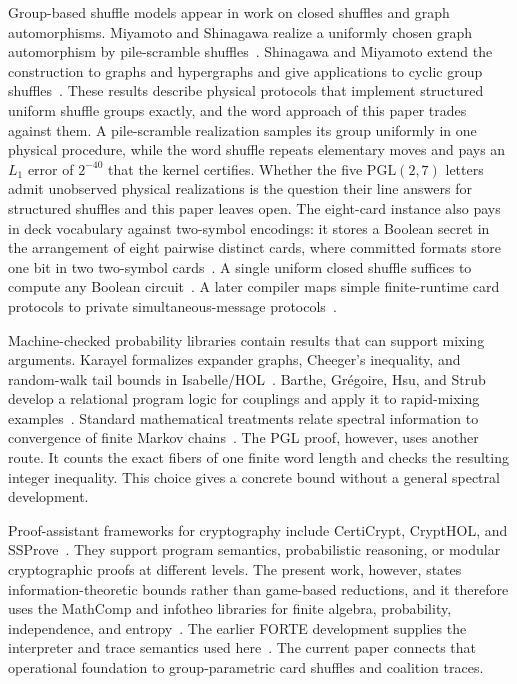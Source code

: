 \documentclass[runningheads]{llncs}
\newcommand{\PG}{\mathrm{PGL}(2,7)}
\begin{document}
Group-based shuffle models appear in work on closed shuffles and graph
automorphisms. Miyamoto and Shinagawa realize a uniformly chosen graph
automorphism by pile-scramble shuffles~\cite{MiyamotoShinagawa2022}.
Shinagawa and Miyamoto extend the construction to graphs and hypergraphs and
give applications to cyclic group shuffles~\cite{ShinagawaMiyamoto2023}.
These results describe physical protocols that implement structured
uniform shuffle groups exactly, and the word approach of this paper trades
against them. A pile-scramble realization samples its group uniformly in
one physical procedure, while the word shuffle repeats elementary moves
and pays an $L_1$ error of $2^{-40}$ that the kernel certifies. Whether
the five $\PG$ letters admit unobserved physical realizations is the
question their line answers for structured shuffles and this paper leaves
open. The eight-card instance also pays in deck vocabulary against
two-symbol encodings: it stores a Boolean secret in the arrangement of
eight pairwise distinct cards, where committed formats store one bit in
two two-symbol cards~\cite{MizukiSone2009}.
A single uniform closed shuffle suffices to
compute any Boolean circuit~\cite{ShinagawaNuida2021}. A later compiler maps
simple finite-runtime card protocols to private simultaneous-message
protocols~\cite{ShinagawaNuida2025}.

Machine-checked probability libraries contain results that can support
mixing arguments. Karayel formalizes expander graphs, Cheeger's inequality,
and random-walk tail bounds in Isabelle/HOL~\cite{Karayel2023}. Barthe,
Gr\'egoire, Hsu, and Strub develop a relational program logic for couplings
and apply it to rapid-mixing examples~\cite{BartheEtAl2017}. Standard
mathematical treatments relate spectral information to convergence of
finite Markov chains~\cite{LevinPeresWilmer2009}. The PGL proof, however, uses another route. It counts the exact fibers of one finite word length and checks the
resulting integer inequality. This choice gives a concrete bound without a
general spectral development.

Proof-assistant frameworks for cryptography include CertiCrypt, CryptHOL, and
SSProve~\cite{CertiCrypt,CryptHOL,SSProve}. They support program semantics,
probabilistic reasoning, or modular cryptographic proofs at different
levels. The present work, however, states information-theoretic bounds rather
than game-based reductions, and it therefore uses the MathComp and
infotheo libraries for finite algebra, probability, independence, and
entropy~\cite{MathComp,InfoTheo}.
The earlier FORTE development supplies the interpreter and trace semantics
used here~\cite{WengEtAl2025}. The current paper connects that operational
foundation to group-parametric card shuffles and coalition traces.
\end{document}
